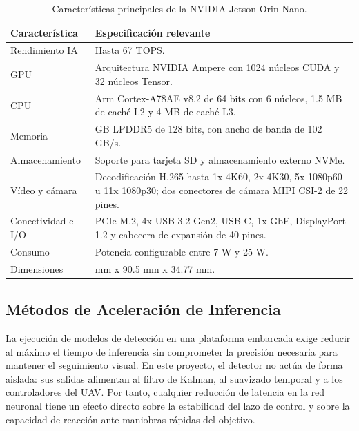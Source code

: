 \begin{table}[H]
\centering
\caption{Características principales de la NVIDIA Jetson Orin Nano.}
\label{tab:caracteristicas-jetson-orin-nano}
\small
\renewcommand{\arraystretch}{1.25}
\setlength{\tabcolsep}{5pt}
\begin{tabular}{>{\raggedright\arraybackslash}p{}>{\raggedright\arraybackslash}p{}}
\hline
\textbf{Característica} & \textbf{Especificación relevante} \\
\hline
Rendimiento IA & Hasta 67 TOPS. \\
GPU & Arquitectura NVIDIA Ampere con 1024 núcleos CUDA y 32 núcleos Tensor. \\
CPU & Arm Cortex-A78AE v8.2 de 64 bits con 6 núcleos, 1.5 MB de caché L2 y 4 MB de caché L3. \\
Memoria & 4 GB LPDDR5 de 128 bits, con ancho de banda de 102 GB/s. \\
Almacenamiento & Soporte para tarjeta SD y almacenamiento externo NVMe. \\
Vídeo y cámara & Decodificación H.265 hasta 1x 4K60, 2x 4K30, 5x 1080p60 u 11x 1080p30; dos conectores de cámara MIPI CSI-2 de 22 pines. \\
Conectividad e I/O & PCIe M.2, 4x USB 3.2 Gen2, USB-C, 1x GbE, DisplayPort 1.2 y cabecera de expansión de 40 pines. \\
Consumo & Potencia configurable entre 7 W y 25 W. \\
Dimensiones & 103 mm x 90.5 mm x 34.77 mm. \\
\hline
\end{tabular}
\end{table}

\vspace{0.3cm}

\subsection{Métodos de Aceleración de Inferencia}

La ejecución de modelos de detección en una plataforma embarcada exige reducir al máximo el tiempo de inferencia sin comprometer la precisión necesaria para mantener el seguimiento visual. En este proyecto, el detector no actúa de forma aislada: sus salidas alimentan al filtro de Kalman, al suavizado temporal y a los controladores del UAV. Por tanto, cualquier reducción de latencia en la red neuronal tiene un efecto directo sobre la estabilidad del lazo de control y sobre la capacidad de reacción ante maniobras rápidas del objetivo.

